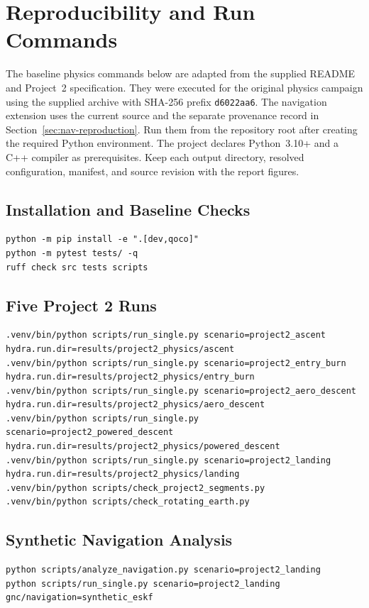 \documentclass[11pt,letterpaper]{article}
\begin{document}
\section{Reproducibility and Run Commands}\label{sec:reproducibility}

The baseline physics commands below are adapted from the supplied README and Project~2 specification. They were executed for the original physics campaign using the supplied archive with SHA-256 prefix \texttt{d6022aa6}. The navigation extension uses the current source and the separate provenance record in Section~\ref{sec:nav-reproduction}. Run them from the repository root after creating the required Python environment. The project declares Python~3.10+ and a C++ compiler as prerequisites. Keep each output directory, resolved configuration, manifest, and source revision with the report figures.

\subsection{Installation and Baseline Checks}
\begin{lstlisting}
python -m pip install -e ".[dev,qoco]"
python -m pytest tests/ -q
ruff check src tests scripts
\end{lstlisting}

\subsection{Five Project 2 Runs}
\begin{lstlisting}
.venv/bin/python scripts/run_single.py scenario=project2_ascent hydra.run.dir=results/project2_physics/ascent
.venv/bin/python scripts/run_single.py scenario=project2_entry_burn hydra.run.dir=results/project2_physics/entry_burn
.venv/bin/python scripts/run_single.py scenario=project2_aero_descent hydra.run.dir=results/project2_physics/aero_descent
.venv/bin/python scripts/run_single.py scenario=project2_powered_descent hydra.run.dir=results/project2_physics/powered_descent
.venv/bin/python scripts/run_single.py scenario=project2_landing hydra.run.dir=results/project2_physics/landing
.venv/bin/python scripts/check_project2_segments.py
.venv/bin/python scripts/check_rotating_earth.py
\end{lstlisting}

\subsection{Synthetic Navigation Analysis}
\begin{lstlisting}
python scripts/analyze_navigation.py scenario=project2_landing
python scripts/run_single.py scenario=project2_landing gnc/navigation=synthetic_eskf
\end{lstlisting}
\end{document}
